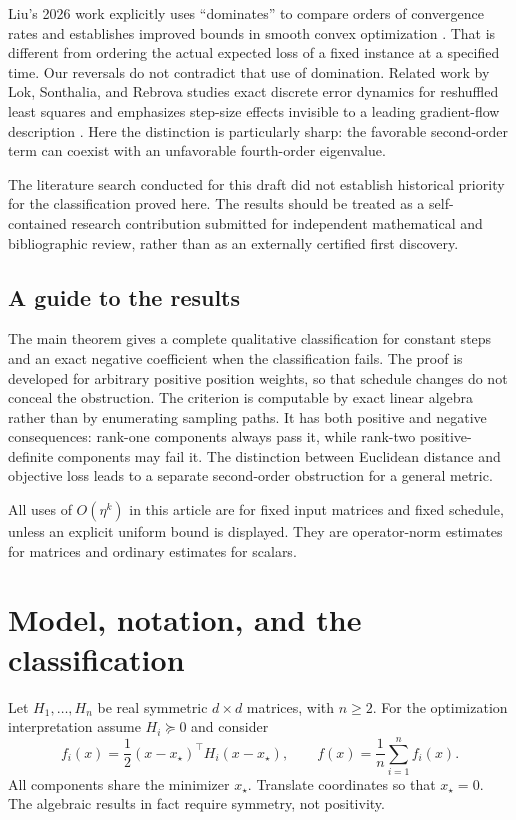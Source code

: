 \documentclass[11pt,letterpaper]{article}
\numberwithin{equation}{section}
\theoremstyle{definition}
\begin{document}
Liu's 2026 work explicitly uses ``dominates'' to compare orders of convergence rates and establishes improved bounds in smooth convex optimization \cite{Liu2026}. That is different from ordering the actual expected loss of a fixed instance at a specified time. Our reversals do not contradict that use of domination. Related work by Lok, Sonthalia, and Rebrova studies exact discrete error dynamics for reshuffled least squares and emphasizes step-size effects invisible to a leading gradient-flow description \cite{Lok2025}. Here the distinction is particularly sharp: the favorable second-order term can coexist with an unfavorable fourth-order eigenvalue.

The literature search conducted for this draft did not establish historical priority for the classification proved here. The results should be treated as a self-contained research contribution submitted for independent mathematical and bibliographic review, rather than as an externally certified first discovery.

\subsection{A guide to the results}

The main theorem gives a complete qualitative classification for constant steps and an exact negative coefficient when the classification fails. The proof is developed for arbitrary positive position weights, so that schedule changes do not conceal the obstruction. The criterion is computable by exact linear algebra rather than by enumerating sampling paths. It has both positive and negative consequences: rank-one components always pass it, while rank-two positive-definite components may fail it. The distinction between Euclidean distance and objective loss leads to a separate second-order obstruction for a general metric.

All uses of $O(\eta^k)$ in this article are for fixed input matrices and fixed schedule, unless an explicit uniform bound is displayed. They are operator-norm estimates for matrices and ordinary estimates for scalars.

\section{Model, notation, and the classification}
\label{sec:model}

Let $H_1,\ldots,H_n$ be real symmetric $d\times d$ matrices, with $n\ge2$. For the optimization interpretation assume $H_i\succeq0$ and consider
\begin{equation}\label{eq:losses}
 f_i(x)=\frac12(x-x_\star)^\top H_i(x-x_\star),\qquad
 f(x)=\frac1n\sum_{i=1}^n f_i(x).
\end{equation}
All components share the minimizer $x_\star$. Translate coordinates so that $x_\star=0$. The algebraic results in fact require symmetry, not positivity.
\end{document}
